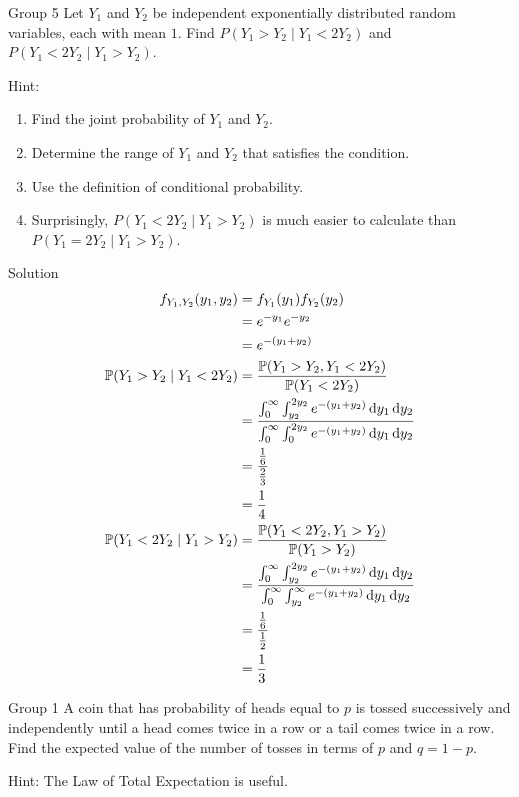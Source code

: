 \documentclass{article}
\begin{document}
\begin{problem}
    {Group 5}
    Let $Y_1$ and $Y_2$ be independent exponentially distributed random variables, each with mean $1$. Find $P( Y_1 > Y_2 \mid Y_1 < 2Y_2)$ and $P( Y_1 < 2Y_2 \mid Y_1 > Y_2)$.
    \begin{solution}
        {Hint:}
        \begin{enumerate}
            \item Find the joint probability of $Y_1$ and $Y_2$.
            \item Determine the range of $Y_1$ and $Y_2$ that satisfies the condition.
            \item Use the definition of conditional probability.
            \item Surprisingly, $P( Y_1 < 2Y_2 \mid Y_1 > Y_2)$ is much easier to calculate than $P( Y_1 = 2Y_2 \mid Y_1 > Y_2)$.
        \end{enumerate}
    \end{solution}
\end{problem}

\begin{solution}
    {Solution}
    \begin{align*}
        f_{Y_1,Y_2}(y_1,y_2)
        &= f_{Y_1}(y_1)f_{Y_2}(y_2) \\
        &= e^{-y_1}e^{-y_2} \\
        &= e^{-(y_1+y_2)} \\
        \P{Y_1>Y_2\mid Y_1<2Y_2}
        &= \frac{\P{Y_1>Y_2,Y_1<2Y_2}}{\P{Y_1<2Y_2}} \\
        &= \frac{\int_{0}^{\infty}\int_{y_2}^{2y_2}e^{-(y_1+y_2)}\diff y_1\diff y_2}{\int_{0}^{\infty}\int_{0}^{2y_2}e^{-(y_1+y_2)}\diff y_1\diff y_2} \\
        &= \frac{\frac{1}{6}}{\frac{2}{3}} \\
        &= \frac{1}{4} \\
        \P{Y_1<2Y_2\mid Y_1>Y_2}
        &= \frac{\P{Y_1<2Y_2,Y_1>Y_2}}{\P{Y_1>Y_2}} \\
        &= \frac{\int_{0}^{\infty}\int_{y_2}^{2y_2}e^{-(y_1+y_2)}\diff y_1\diff y_2}{\int_{0}^{\infty}\int_{y_2}^{\infty}e^{-(y_1+y_2)}\diff y_1\diff y_2} \\
        &= \frac{\frac{1}{6}}{\frac{1}{2}} \\
        &= \frac{1}{3}
    \end{align*}
\end{solution}
\begin{problem}
    {Group 1}
    A coin that has probability of heads equal to $p$ is tossed successively and independently until a head comes twice in a row or a tail comes twice in a row. Find the expected value of the number of tosses in terms of $p$ and $q=1-p$.
    \begin{solution}
        {Hint:}
        The Law of Total Expectation is useful.
    \end{solution}
\end{problem}
\end{document}
